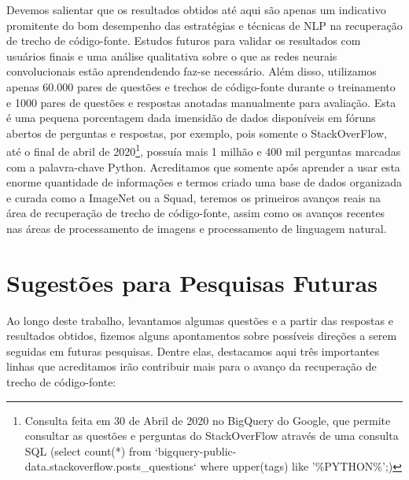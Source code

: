 Devemos salientar que os resultados obtidos até aqui são apenas um indicativo promitente do bom desempenho das estratégias e técnicas de NLP na recuperação de trecho de código-fonte. Estudos futuros para validar os resultados com usuários finais e uma análise qualitativa sobre o que as redes neurais convolucionais estão aprendendendo faz-se necessário. Além disso, utilizamos apenas 60.000 pares de questões e trechos de código-fonte durante o treinamento e 1000 pares de questões e respostas anotadas manualmente para avaliação. Esta é uma pequena porcentagem dada imensidão de dados disponíveis em fóruns abertos de perguntas e respostas, por exemplo, pois somente o StackOverFlow, até o final de abril de 2020\footnote{Consulta feita em 30 de Abril de 2020 no BigQuery do Google, que permite consultar as questões e perguntas do StackOverFlow através de uma consulta SQL (select count(*) from `bigquery-public-data.stackoverflow.posts\_questions` where upper(tags) like '\%PYTHON\%';)}, possuía mais 1 milhão e 400 mil perguntas marcadas com a palavra-chave Python. Acreditamos que somente após aprender a usar esta enorme quantidade de informações e termos criado uma base de dados organizada e curada como a ImageNet ou a Squad, teremos os primeiros avanços reais na área de recuperação de trecho de código-fonte, assim como os avanços recentes nas áreas de processamento de imagens e processamento de linguagem natural.



\section{Sugestões para Pesquisas Futuras} 

Ao longo deste trabalho, levantamos algumas questões e a partir das respostas e resultados obtidos, fizemos alguns apontamentos sobre possíveis direções a serem seguidas em futuras pesquisas. Dentre elas, destacamos aqui três importantes linhas que acreditamos irão contribuir mais para o avanço da recuperação de trecho de código-fonte:

